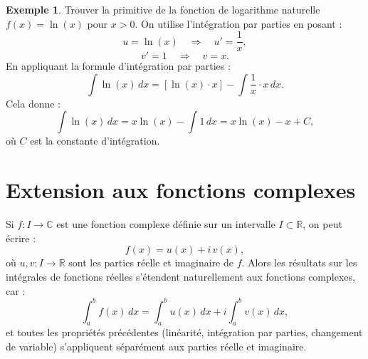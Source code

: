 \documentclass{report} %
\theoremstyle{definition}  %
\newtheorem{example}{Exemple}[chapter]
\theoremstyle{plain} %
\theoremstyle{remark} %
\begin{document}
\begin{example}
    Trouver la primitive de la fonction de logarithme naturelle \(f(x) = \ln(x)\) pour \(x > 0\).
    \noindent
    On utilise l'intégration par parties en posant :
    \[u = \ln(x) \quad \Rightarrow \quad u' = \frac{1}{x},\]
    \[v' = 1 \quad \Rightarrow \quad v = x.\]
    \noindent
    En appliquant la formule d'intégration par parties :
    \[\int \ln(x)\, dx = [\ln(x) \cdot x] - \int \frac{1}{x} \cdot x\, dx.\]
    \noindent
    Cela donne :
    \[\int \ln(x)\, dx = x \ln(x) - \int 1\, dx = x \ln(x) - x + C,\]
    où \(C\) est la constante d'intégration. 
\end{example}
\medskip

\section{\textbf{Extension aux fonctions complexes}}

Si \(f : I \to \mathbb{C}\) est une fonction complexe définie sur un intervalle \(I \subset \mathbb{R}\), on peut écrire :
\[
f(x) = u(x) + i\, v(x),
\]
où \(u,v : I \to \mathbb{R}\) sont les parties réelle et imaginaire de \(f\).  
Alors les résultats sur les intégrales de fonctions réelles s'étendent naturellement aux fonctions complexes, car :
\[
\int_a^b f(x)\, dx = \int_a^b u(x)\, dx + i \int_a^b v(x)\, dx,
\]
et toutes les propriétés précédentes (linéarité, intégration par parties, changement de variable) s'appliquent séparément aux parties réelle et imaginaire.
\end{document}
